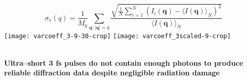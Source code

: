 {{\begin{minipage}[ ]{.9\colwidth}
\begin{center}
{\begin{equation*}
               \sigma_\text{v}(q) = \frac{1}{M_q}\sum_{\mathbf{q}: |\mathbf{q}|=q} \frac{ \sqrt{\frac{1}{N} \sum_{i=1}^N \left( I_i(\mathbf{q}) - \langle I(\mathbf{q})\rangle_N \right)^2 } } { \langle I(\mathbf{q})\rangle_N }
               \label{eqn:coeff_variation}
             \end{equation*}
           }
           \hspace*{.05\textwidth}
             \texttt{[image: varcoeff\_3-9-30-crop]}%
            \hfill
            \texttt{[image: varcoeff\_3scaled-9-crop]}%
           \hspace*{.05\textwidth}
          \end{center}
        \end{minipage}\\[1ex]
    \textbf{Ultra--short 3 fs pulses do not contain enough photons to produce
      reliable diffraction data despite negligible radiation damage}
    }%
}
